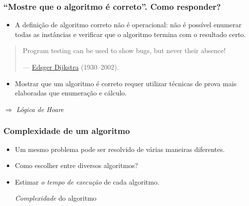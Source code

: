 \documentclass{beamer}
\begin{document}
\begin{frame}

\frametitle{``Mostre que o algoritmo é correto''. Como responder?}

\begin{itemize}
\item A definição de algoritmo correto não é operacional: não é possível
enumerar todas as instâncias e verificar que o algoritmo termina com o resultado certo.
\end{itemize}

\begin{quote}
Program testing can be used to show bugs, but never their absence!

--- \href{http://en.wikipedia.org/wiki/Edsger_W._Dijkstra}{Edsger Dijkstra} (1930--2002).
\end{quote}

\begin{itemize}
\item Mostrar que um algoritmo é correto requer utilizar técnicas de prova mais
  elaboradas que enumeração e cálculo.
\end{itemize}

\pause

\begin{center}
$\Rightarrow$ \emph{Lógica de Hoare}
\end{center}

\end{frame}

\begin{frame}

  \frametitle{Complexidade de um algoritmo}

  \begin{itemize}
    \item Um mesmo problema pode ser resolvido de várias maneiras diferentes.
    \item Como escolher entre diversos algoritmos?
    \item Estimar \emph{o tempo de execução\/} de cada algoritmo.

      \emph{Complexidade\/} do algoritmo
  \end{itemize}

\end{frame}
\end{document}
